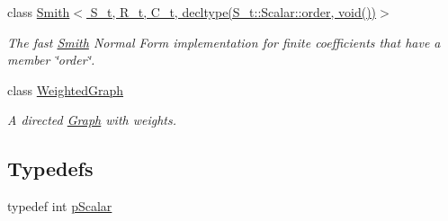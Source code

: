 \begin{DoxyCompactItemize}
class \hyperlink{classMackey_1_1Smith_3_01S__t_00_01R__t_00_01C__t_00_01decltype_07S__t_1_1Scalar_1_1order_00_01void_07_08_08_4}{Smith$<$ S\+\_\+t, R\+\_\+t, C\+\_\+t, decltype(\+S\+\_\+t\+::\+Scalar\+::order, void())$>$}
\begin{DoxyCompactList}\small\item\em The fast \hyperlink{classMackey_1_1Smith}{Smith} Normal Form implementation for finite coefficients that have a member \char`\"{}order\char`\"{}. \end{DoxyCompactList}\item 
class \hyperlink{classMackey_1_1WeightedGraph}{Weighted\+Graph}
\begin{DoxyCompactList}\small\item\em A directed \hyperlink{classMackey_1_1Graph}{Graph} with weights. \end{DoxyCompactList}\end{DoxyCompactItemize}
\subsection*{Typedefs}
\begin{DoxyCompactItemize}
\item 
typedef int \hyperlink{namespaceMackey_a4f147e328c520f568f5d3adf1c75f514}{p\+Scalar}
\end{DoxyCompactItemize}
